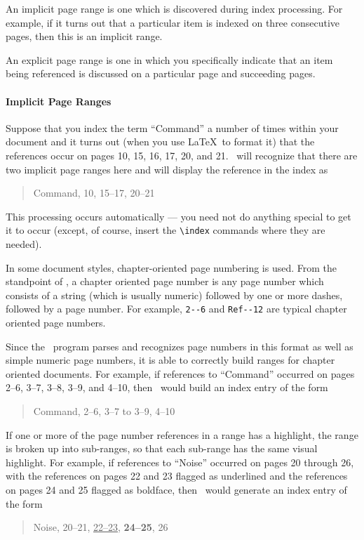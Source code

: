 An implicit page range is one which is discovered during index processing.  For
example, if it turns out that a particular item is indexed on three consecutive
pages, then this is an implicit range. 

An explicit page range is one in which you specifically indicate that an item
being referenced is discussed on a particular page and succeeding pages. 

\paragraph{Implicit Page Ranges}

Suppose  that you index the term ``Command'' a
number of times within your document and it turns out (when you use \LaTeX\ to
format it) that the references occur on pages 10, 15, 16, 17, 20, and 21.
\IdxTeX\ will recognize that there are two implicit page ranges here and will
display the reference in the index as
\begin{quote}
\qquad Command, 10, 15--17, 20--21
\end{quote}
This processing occurs automatically --- you need not do anything special to
get it to occur (except, of course, insert the \verb+\index+ commands where
they are needed).

In some document styles, chapter-oriented page numbering is used.  From the
standpoint of \IdxTeX, a chapter oriented page number is any page number which
consists of a string (which is usually numeric) followed by one or more dashes,
followed by a page number.  For example, \verb+2--6+ and \verb+Ref--12+ are
typical chapter oriented page numbers.

Since the \IdxTeX\ program parses and recognizes page numbers in this format
as well as simple numeric page numbers, it is able to correctly build ranges
for chapter oriented documents.  For example, if references to ``Command''
occurred on pages 2--6, 3--7, 3--8, 3--9, and 4--10, then \IdxTeX\ would
build an index entry of the form
\begin{quote}
\qquad Command, 2--6, 3--7 to 3--9, 4--10
\end{quote}

 If
one or more of the page number references in a range has a highlight, the range
is broken up into sub-ranges, so that each sub-range has the same visual
highlight.  For example, if references to ``Noise'' occurred on pages 20 through
26, with the references on pages 22 and 23 flagged as underlined and the 
references on pages 24 and 25 flagged as boldface, then \IdxTeX\ would generate
an index entry of the form
\begin{quote}
\qquad Noise, 20--21, \underline{22--23}, {\bf 24--25}, 26
\end{quote}

